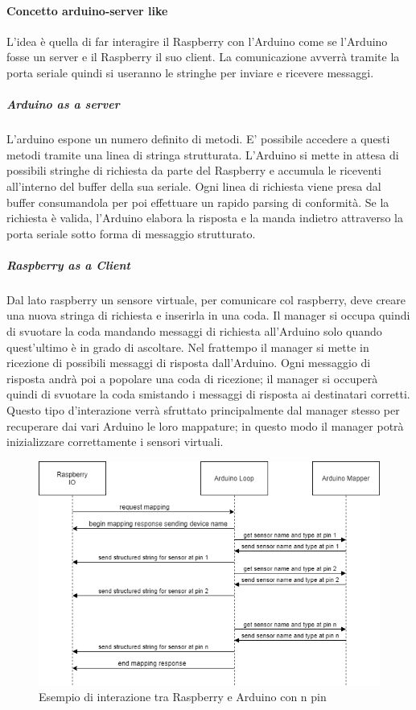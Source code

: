 \documentclass[12pt]{article}
\begin{document}
\paragraph{Concetto arduino-server like}
L'idea è quella di far interagire il Raspberry con l'Arduino come se l'Arduino fosse un server e il Raspberry il suo client. La comunicazione avverrà tramite la porta seriale quindi si useranno le stringhe per inviare e ricevere messaggi.  

\subparagraph{Arduino as a server}
L'arduino espone un numero definito di metodi. E' possibile accedere a questi metodi tramite una linea di stringa strutturata. L'Arduino si mette in attesa di possibili stringhe di richiesta da parte del Raspberry e accumula le riceventi all'interno del buffer della sua seriale.
Ogni linea di richiesta viene presa dal buffer consumandola per poi effettuare un rapido parsing di conformità. Se la richiesta è valida, l'Arduino elabora la risposta e la manda indietro attraverso la porta seriale sotto forma di messaggio strutturato.
\subparagraph{Raspberry as a Client}
Dal lato raspberry un sensore virtuale, per comunicare col raspberry, deve creare una nuova stringa di richiesta e inserirla in una coda. 
Il manager si occupa quindi di svuotare la coda mandando messaggi di richiesta all'Arduino solo quando quest'ultimo è in grado di ascoltare. Nel frattempo il manager si mette in ricezione di possibili messaggi di risposta dall'Arduino. Ogni messaggio di risposta andrà poi a popolare una coda di ricezione; il manager si occuperà quindi di svuotare la coda smistando i messaggi di risposta ai destinatari corretti.
Questo tipo d'interazione verrà sfruttato principalmente dal manager stesso per recuperare dai vari Arduino le loro mappature; in questo modo il manager potrà inizializzare correttamente i sensori virtuali.
\begin{figure}[h!]
\centering
	\includegraphics[scale=0.75]{img/parteLocale/RaspArduInterationDiagram.png}  
    \caption{Esempio di interazione tra Raspberry e Arduino con n pin}
\end{figure}
\newpage
\end{document}
